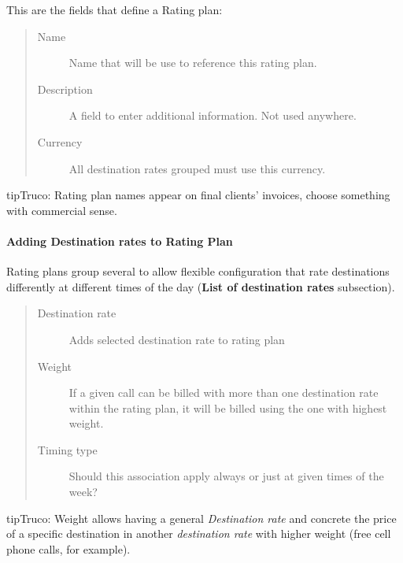 \documentclass[letterpaper,10pt,spanish]{sphinxmanual}
\begin{document}
This are the fields that define a Rating plan:
\begin{quote}
\begin{description}
\item[{Name}] \leavevmode
Name that will be use to reference this rating plan.

\item[{Description}] \leavevmode
A field to enter additional information. Not used anywhere.

\item[{Currency}] \leavevmode
All destination rates grouped must use this currency.

\end{description}
\end{quote}

\begin{notice}{tip}{Truco:}
Rating plan names appear on final clients' invoices, choose something with commercial sense.
\end{notice}


\paragraph{Adding Destination rates to Rating Plan}
\label{administration_portal/brand/billing/rating_plans:adding-destination-rates-to-rating-plan}
Rating plans group several {\hyperref[administration_portal/brand/billing/destination_rates:destination\string-rates]{}} to allow flexible configuration that rate destinations differently
at different times of the day (\textbf{List of destination rates} subsection).
\begin{quote}
\begin{description}
\item[{Destination rate}] \leavevmode
Adds selected destination rate to rating plan

\item[{Weight}] \leavevmode
If a given call can be billed with more than one destination rate within the rating plan,
it will be billed using the one with highest weight.

\item[{Timing type}] \leavevmode
Should this association apply always or just at given times of the week?

\end{description}
\end{quote}

\begin{notice}{tip}{Truco:}
Weight allows having a general \emph{Destination rate} and concrete the price of
a specific destination in another \emph{destination rate} with higher weight (free cell
phone calls, for example).
\end{notice}
\end{document}
